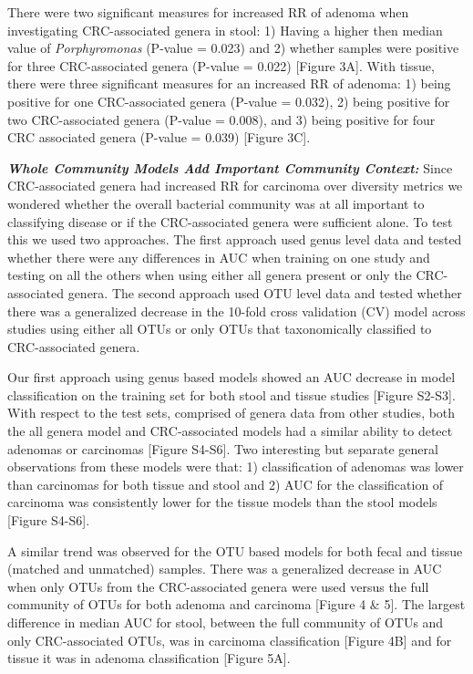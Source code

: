 \documentclass[12pt,]{article}
\begin{document}
There were two significant measures for increased RR of adenoma when
investigating CRC-associated genera in stool: 1) Having a higher then
median value of \emph{Porphyromonas} (P-value = 0.023) and 2) whether
samples were positive for three CRC-associated genera (P-value = 0.022)
{[}Figure 3A{]}. With tissue, there were three significant measures for
an increased RR of adenoma: 1) being positive for one CRC-associated
genera (P-value = 0.032), 2) being positive for two CRC-associated
genera (P-value = 0.008), and 3) being positive for four CRC associated
genera (P-value = 0.039) {[}Figure 3C{]}.

\textbf{\emph{Whole Community Models Add Important Community Context:}}
Since CRC-associated genera had increased RR for carcinoma over
diversity metrics we wondered whether the overall bacterial community
was at all important to classifying disease or if the CRC-associated
genera were sufficient alone. To test this we used two approaches. The
first approach used genus level data and tested whether there were any
differences in AUC when training on one study and testing on all the
others when using either all genera present or only the CRC-associated
genera. The second approach used OTU level data and tested whether there
was a generalized decrease in the 10-fold cross validation (CV) model
across studies using either all OTUs or only OTUs that taxonomically
classified to CRC-associated genera.

Our first approach using genus based models showed an AUC decrease in
model classification on the training set for both stool and tissue
studies {[}Figure S2-S3{]}. With respect to the test sets, comprised of
genera data from other studies, both the all genera model and
CRC-associated models had a similar ability to detect adenomas or
carcinomas {[}Figure S4-S6{]}. Two interesting but separate general
observations from these models were that: 1) classification of adenomas
was lower than carcinomas for both tissue and stool and 2) AUC for the
classification of carcinoma was consistently lower for the tissue models
than the stool models {[}Figure S4-S6{]}.

A similar trend was observed for the OTU based models for both fecal and
tissue (matched and unmatched) samples. There was a generalized decrease
in AUC when only OTUs from the CRC-associated genera were used versus
the full community of OTUs for both adenoma and carcinoma {[}Figure 4 \&
5{]}. The largest difference in median AUC for stool, between the full
community of OTUs and only CRC-associated OTUs, was in carcinoma
classification {[}Figure 4B{]} and for tissue it was in adenoma
classification {[}Figure 5A{]}.
\end{document}
